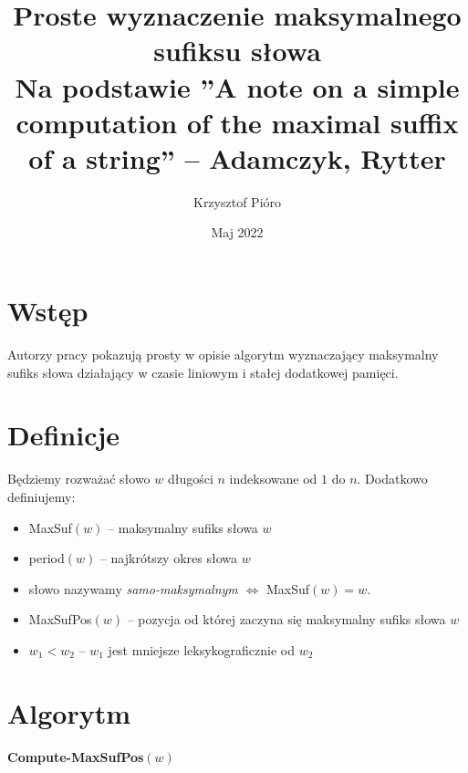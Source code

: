 \documentclass{article}
\title{Proste wyznaczenie maksymalnego sufiksu słowa\\ \large Na podstawie ''A note on a simple computation of the maximal suffix
of a string'' -- Adamczyk, Rytter}
\author{Krzysztof Pióro}
\date{Maj 2022}
\begin{document}
\maketitle

\section{Wstęp}

Autorzy pracy pokazują prosty w opisie algorytm wyznaczający maksymalny sufiks słowa działający w czasie liniowym i stałej dodatkowej pamięci.

\section{Definicje}

Będziemy rozważać słowo $w$ długości $n$ indeksowane od $1$ do $n$. Dodatkowo definiujemy:

\begin{itemize}
    \item MaxSuf$(w)$ -- maksymalny sufiks słowa $w$
    \item period$(w)$ -- najkrótszy okres słowa $w$
    \item słowo nazywamy \textit{samo-maksymalnym} $\iff$ MaxSuf$(w) = w$.
    \item MaxSufPos$(w)$ -- pozycja od której zaczyna się maksymalny sufiks słowa $w$
    \item $w_1 < w_2$ -- $w_1$ jest mniejsze leksykograficznie od $w_2$
\end{itemize}



\section{Algorytm}

\begin{algorithm}[H]
    \caption{\textbf{Compute-MaxSufPos$(w)$}}
\end{algorithm}
\end{document}
